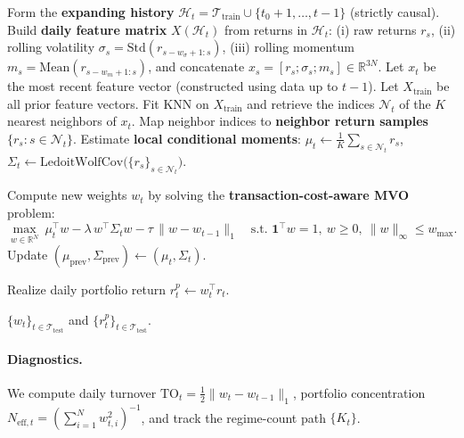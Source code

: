 \documentclass[11pt]{article}
\begin{document}
\begin{algorithm}[H]
\begin{algorithmic}[1]
\vspace{0.25em}
    \State Form the \textbf{expanding history} $\mathcal{H}_t = \mathcal{T}_{\text{train}} \cup \{t_0+1,\dots,t-1\}$ (strictly causal).
    \State Build \textbf{daily feature matrix} $X(\mathcal{H}_t)$ from returns in $\mathcal{H}_t$:
        \Statex \hspace{1.5em} (i) raw returns $r_s$,
        \Statex \hspace{1.5em} (ii) rolling volatility $\sigma_s=\mathrm{Std}(r_{s-w_{\sigma}+1:s})$,
        \Statex \hspace{1.5em} (iii) rolling momentum $m_s=\mathrm{Mean}(r_{s-w_{m}+1:s})$,
        \Statex \hspace{1.5em} and concatenate $x_s = [r_s;\sigma_s;m_s] \in \mathbb{R}^{3N}$.
    \State Let $x_t$ be the most recent feature vector (constructed using data up to $t-1$). Let $X_{\text{train}}$ be all prior feature vectors.
    \State Fit KNN on $X_{\text{train}}$ and retrieve the indices $\mathcal{N}_t$ of the $K$ nearest neighbors of $x_t$.
    \State Map neighbor indices to \textbf{neighbor return samples} $\{r_s : s \in \mathcal{N}_t\}$.
    \State Estimate \textbf{local conditional moments}:
        \Statex \hspace{1.5em} $\mu_t \leftarrow \frac{1}{K}\sum_{s\in \mathcal{N}_t} r_s$, \quad
        \Statex \hspace{1.5em} $\Sigma_t \leftarrow \text{LedoitWolfCov}\big(\{r_s\}_{s\in\mathcal{N}_t}\big)$.

        \State Compute new weights $w_t$ by solving the \textbf{transaction-cost-aware MVO} problem:
        \[
        \max_{w\in\mathbb{R}^N}\ 
        \mu_t^\top w - \lambda\, w^\top \Sigma_t w - \tau\,\|w-w_{t-1}\|_1
        \quad \text{s.t. } \mathbf{1}^\top w = 1,\ w\ge 0,\ \|w\|_\infty \le w_{\max}.
        \]
        \State Update $(\mu_{\text{prev}},\Sigma_{\text{prev}})\leftarrow (\mu_t,\Sigma_t)$.

    \State Realize daily portfolio return $r^{p}_t \leftarrow w_t^\top r_t$.
\EndFor

\State \Return $\{w_t\}_{t\in\mathcal{T}_{\text{test}}}$ and $\{r^{p}_t\}_{t\in\mathcal{T}_{\text{test}}}$.
\end{algorithmic}
\end{algorithm}
\paragraph{Diagnostics.}
We compute daily turnover $\mathrm{TO}_t=\frac{1}{2}\|w_t-w_{t-1}\|_1$, portfolio concentration $N_{\mathrm{eff},t}=\left(\sum_{i=1}^{N}w_{t,i}^2\right)^{-1}$, and track the regime-count path $\{K_t\}$.
\end{document}
